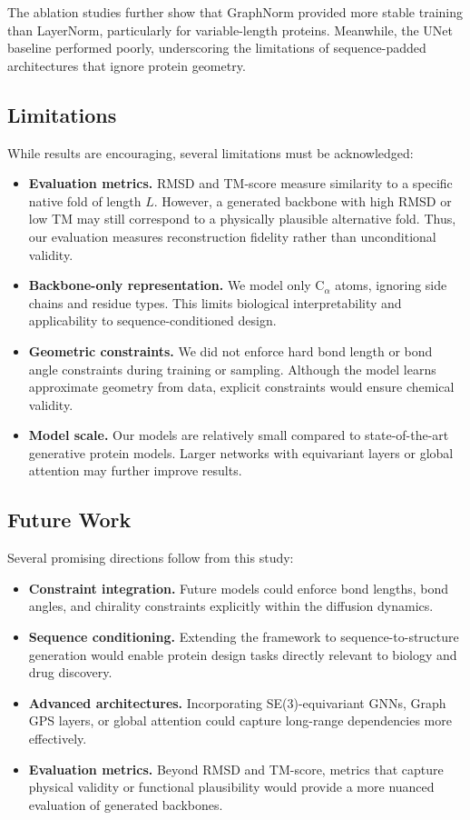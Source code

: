 \documentclass[a4paper,12pt]{article}
\begin{document}
The ablation studies further show that GraphNorm provided more stable training than LayerNorm, particularly for variable-length proteins. Meanwhile, the UNet baseline performed poorly, underscoring the limitations of sequence-padded architectures that ignore protein geometry. 

\subsection{Limitations}\label{subsec:limitations}
While results are encouraging, several limitations must be acknowledged:
\begin{itemize}
    \item \textbf{Evaluation metrics.} RMSD and TM-score measure similarity to a specific native fold of length \(L\). However, a generated backbone with high RMSD or low TM may still correspond to a physically plausible alternative fold. Thus, our evaluation measures reconstruction fidelity rather than unconditional validity.
    \item \textbf{Backbone-only representation.} We model only C\(_\alpha\) atoms, ignoring side chains and residue types. This limits biological interpretability and applicability to sequence-conditioned design.
    \item \textbf{Geometric constraints.} We did not enforce hard bond length or bond angle constraints during training or sampling. Although the model learns approximate geometry from data, explicit constraints would ensure chemical validity.
    \item \textbf{Model scale.} Our models are relatively small compared to state-of-the-art generative protein models. Larger networks with equivariant layers or global attention may further improve results.
\end{itemize}

\subsection{Future Work}\label{subsec:future-work}
Several promising directions follow from this study:
\begin{itemize}
    \item \textbf{Constraint integration.} Future models could enforce bond lengths, bond angles, and chirality constraints explicitly within the diffusion dynamics.
    \item \textbf{Sequence conditioning.} Extending the framework to sequence-to-structure generation would enable protein design tasks directly relevant to biology and drug discovery.
    \item \textbf{Advanced architectures.} Incorporating SE(3)-equivariant GNNs, Graph GPS layers, or global attention could capture long-range dependencies more effectively.
    \item \textbf{Evaluation metrics.} Beyond RMSD and TM-score, metrics that capture physical validity or functional plausibility would provide a more nuanced evaluation of generated backbones.
\end{itemize}
\end{document}
